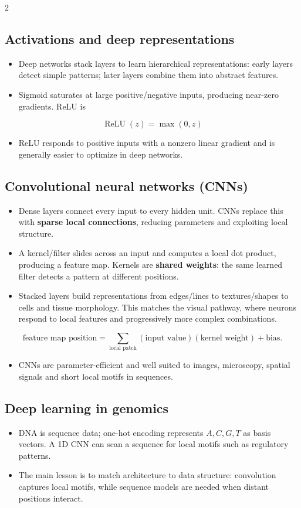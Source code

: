 \documentclass[10pt,a4paper]{ctexart}
\newcommand{\key}[1]{\textbf{#1}}
\newcommand{\formula}[1]{%
  \par\vspace{1pt}\begingroup
  \setlength{\abovedisplayskip}{0pt}\setlength{\belowdisplayskip}{0pt}
  \[ #1 \]\endgroup\vspace{1pt}}
\begin{document}
\begin{multicols*}{2}
\subsection{Activations and deep representations}
\begin{itemize}
  \item Deep networks stack layers to learn hierarchical representations: early layers detect simple patterns; later layers combine them into abstract features.
  \item Sigmoid saturates at large positive/negative inputs, producing near-zero gradients. ReLU is
\end{itemize}
\formula{\operatorname{ReLU}(z)=\max(0,z)}
\begin{itemize}
  \item ReLU responds to positive inputs with a nonzero linear gradient and is generally easier to optimize in deep networks.
\end{itemize}

\subsection{Convolutional neural networks (CNNs)}
\begin{itemize}
  \item Dense layers connect every input to every hidden unit. CNNs replace this with \key{sparse local connections}, reducing parameters and exploiting local structure.
  \item A kernel/filter slides across an input and computes a local dot product, producing a feature map. Kernels are \key{shared weights}: the same learned filter detects a pattern at different positions.
  \item Stacked layers build representations from edges/lines to textures/shapes to cells and tissue morphology. This matches the visual pathway, where neurons respond to local features and progressively more complex combinations.
\end{itemize}
\formula{\text{feature map position}=\sum_{\text{local patch}}(\text{input value})(\text{kernel weight})+\text{bias}.}
\begin{itemize}
  \item CNNs are parameter-efficient and well suited to images, microscopy, spatial signals and short local motifs in sequences.
\end{itemize}

\subsection{Deep learning in genomics}
\begin{itemize}
  \item DNA is sequence data; one-hot encoding represents \(A,C,G,T\) as basis vectors. A 1D CNN can scan a sequence for local motifs such as regulatory patterns.
  \item The main lesson is to match architecture to data structure: convolution captures local motifs, while sequence models are needed when distant positions interact.
\end{itemize}


\end{multicols*}
\end{document}
